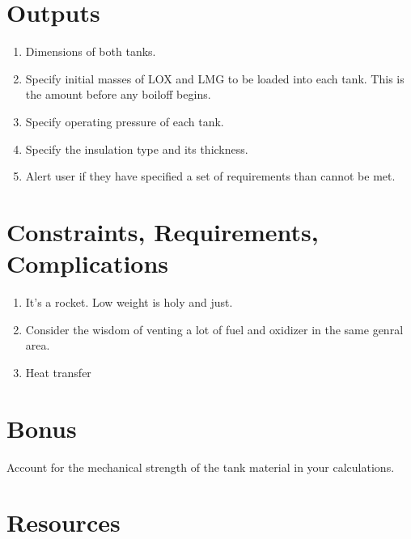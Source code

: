 \documentclass[]{tufte-book}
\providecommand{\tightlist}{%
  \setlength{\itemsep}{0pt}\setlength{\parskip}{0pt}}
\begin{document}
\hypertarget{outputs}{%
\section{Outputs}\label{outputs}}

\begin{enumerate}
\def\labelenumi{\arabic{enumi}.}
\tightlist
\item
  Dimensions of both tanks.
\item
  Specify initial masses of LOX and LMG to be loaded into each tank. This is the amount before any boiloff begins.
\item
  Specify operating pressure of each tank.
\item
  Specify the insulation type and its thickness.
\item
  Alert user if they have specified a set of requirements than cannot be met.
\end{enumerate}

\hypertarget{constraints-requirements-complications}{%
\section{Constraints, Requirements, Complications}\label{constraints-requirements-complications}}

\begin{enumerate}
\def\labelenumi{\arabic{enumi}.}
\tightlist
\item
  It's a rocket. Low weight is holy and just.
\item
  Consider the wisdom of venting a lot of fuel and oxidizer in the same genral area.
\item
  Heat transfer
\end{enumerate}

\hypertarget{bonus}{%
\section{Bonus}\label{bonus}}

Account for the mechanical strength of the tank material in your calculations.

\hypertarget{resources}{%
\section{Resources}\label{resources}}
\end{document}
